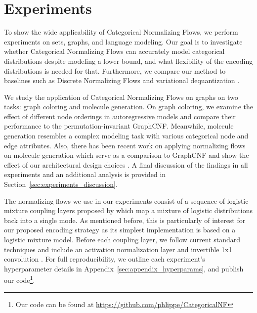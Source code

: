 \section{Experiments}
\label{sec:experiments}

To show the wide applicability of Categorical Normalizing Flows, we perform experiments on sets, graphs, and language modeling. 
Our goal is to investigate whether Categorical Normalizing Flows can accurately model categorical distributions despite modeling a lower bound, and what flexibility of the encoding distributions is needed for that.
Furthermore, we compare our method to baselines such as Discrete Normalizing Flows \cite{TranDiscreteFlows} and variational dequantization \cite{Flow++}. 

We study the application of Categorical Normalizing Flows on graphs on two tasks: graph coloring and molecule generation. 
On graph coloring, we examine the effect of different node orderings in autoregressive models and compare their performance to the permutation-invariant GraphCNF.
Meanwhile, molecule generation resembles a complex modeling task with various categorical node and edge attributes.
Also, there has been recent work on applying normalizing flows on molecule generation which serve as a comparison to GraphCNF and show the effect of our architectural design choices \cite{GraphNVP, GraphAF}.
A final discussion of the findings in all experiments and an additional analysis is provided in Section~\ref{sec:experiments_discussion}.

The normalizing flows we use in our experiments consist of a sequence of logistic mixture coupling layers proposed by \citet{Flow++} which map a mixture of logistic distributions back into a single mode. 
As mentioned before, this is particularly of interest for our proposed encoding strategy as its simplest implementation is based on a logistic mixture model.
Before each coupling layer, we follow current standard techniques and include an activation normalization layer and invertible 1x1 convolution \cite{Glow}.  
For full reproducibility, we outline each experiment's hyperparameter details in Appendix~\ref{sec:appendix_hyperparams}, and publish our code\footnote{Our code can be found at \href{https://github.com/phlippe/CategoricalNF}{https://github.com/phlippe/CategoricalNF}}.

